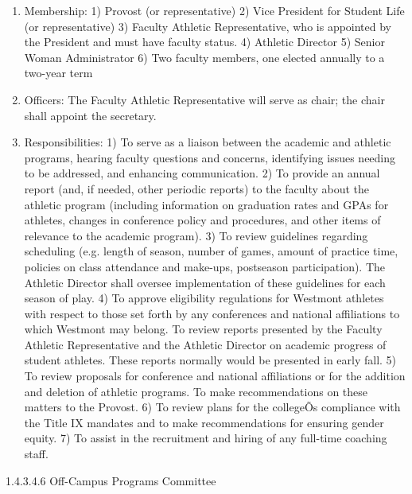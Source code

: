 \documentclass[letterpaper, 11pt]{article}
\begin{document}
				\begin{enumerate}[label=\alph*)]
					\item{Membership:}
					1) Provost (or representative)
					2) Vice President for Student Life (or representative)
					3) Faculty Athletic Representative, who is appointed by the President and must have faculty status.
					4) Athletic Director
					5) Senior Woman Administrator
					6) Two faculty members, one elected annually to a two-year term
					\item{Officers:}
					The Faculty Athletic Representative will serve as chair; the chair shall appoint the secretary.
					\item{Responsibilities:}
					1) To serve as a liaison between the academic and athletic programs, hearing faculty questions and concerns, identifying issues needing to be addressed, and enhancing communication.
					2) To provide an annual report (and, if needed, other periodic reports) to the faculty about the athletic program (including information on graduation rates and GPAs for athletes, changes in conference policy and procedures, and other items of relevance to the academic program).
					3) To review guidelines regarding scheduling (e.g. length of season, number of games, amount of practice time, policies on class attendance and make-ups, postseason participation).  The Athletic Director shall oversee implementation of these guidelines for each season of play.
					4) To approve eligibility regulations for Westmont athletes with respect to those set forth by any conferences and national affiliations to which Westmont may belong.  To review reports presented by the Faculty Athletic Representative and the Athletic Director on academic progress of student athletes.  These reports normally would be presented in early fall.
					5) To review proposals for conference and national affiliations or for the addition and deletion of athletic programs.  To make recommendations on these matters to the Provost.
					6) To review plans for the collegeÕs compliance with the Title IX mandates and to make recommendations for ensuring gender equity.
					7) To assist in the recruitment and hiring of any full-time coaching staff.
				\end{enumerate}
				1.4.3.4.6 Off-Campus Programs Committee
\end{document}

